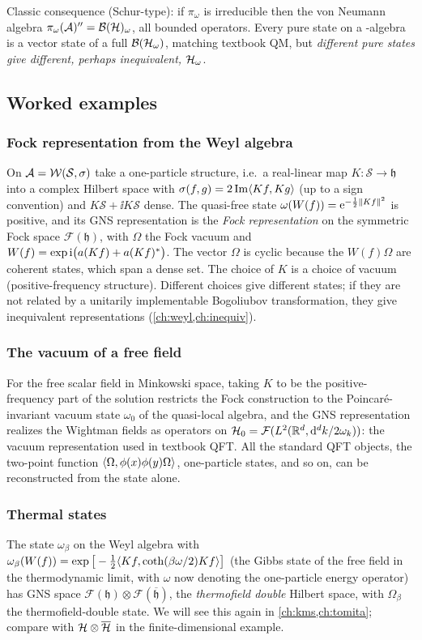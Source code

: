 Classic consequence (Schur-type): if $\pi_\omega$ is irreducible then the von Neumann algebra $\pi_\omega(\mathcal{A})''=\mathcal{B}(\mathcal{H})_\omega$, all bounded operators. Every pure state on a \cstar-algebra is a vector state of a full $\mathcal{B}(\mathcal{H}_\omega)$, matching textbook QM, but \emph{different pure states give different, perhaps inequivalent, $\mathcal{H}_\omega$}.

\subsection{Worked examples}

\subsubsection{Fock representation from the Weyl algebra}
On $\mathcal{A}=\mathcal W(\mathcal S,\sigma)$ take a one-particle structure, i.e.\ a real-linear map $K:\mathcal S\to\mathfrak h$ into a complex Hilbert space with $\sigma(f,g)=2\,\mathrm{Im}\langle Kf,Kg\rangle$ (up to a sign convention) and $K\mathcal S+\ii K\mathcal S$ dense. The quasi-free state $\omega(W(f))=\mathrm{e}^{-\frac12\lVert Kf\rVert^2}$ is positive, and its GNS representation is the \emph{Fock representation} on the symmetric Fock space $\mathcal F(\mathfrak h)$, with $\Omega$ the Fock vacuum and $W(f)=\exp\mathrm{i}\big(a(Kf)+a(Kf)^{*}\big)$. The vector $\Omega$ is cyclic because the $W(f)\Omega$ are coherent states, which span a dense set. The choice of $K$ is a choice of vacuum (positive-frequency structure). Different choices give different states; if they are not related by a unitarily implementable Bogoliubov transformation, they give inequivalent representations (\cref{ch:weyl,ch:inequiv}).

\subsubsection{The vacuum of a free field}
For the free scalar field in Minkowski space, taking $K$ to be the positive-frequency part of the solution restricts the Fock construction to the Poincar\'e-invariant vacuum state $\omega_0$ of the quasi-local algebra, and the GNS representation realizes the Wightman fields as operators on $\mathcal{H}_0=\mathcal F(L^2(\mathbb{R}^d,\mathrm{d}^dk/2\omega_k))$: the vacuum representation used in textbook QFT. All the standard QFT objects, the two-point function $\langle \Omega,\phi(x)\phi(y)\Omega\rangle$, one-particle states, and so on, can be reconstructed from the state alone.

\subsubsection{Thermal states}
The state $\omega_\beta$ on the Weyl algebra with $\omega_\beta(W(f))=\exp\big[-\tfrac12\langle Kf,\coth(\beta\omega/2)Kf\rangle\big]$ (the Gibbs state of the free field in the thermodynamic limit, with $\omega$ now denoting the one-particle energy operator) has GNS space $\mathcal F(\mathfrak h)\otimes\mathcal F(\overline{\mathfrak h})$, the \emph{thermofield double} Hilbert space, with $\Omega_\beta$ the thermofield-double state. We will see this again in \cref{ch:kms,ch:tomita}; compare with $\mathcal{H}\otimes\overline{\mathcal{H}}$ in the finite-dimensional example.

